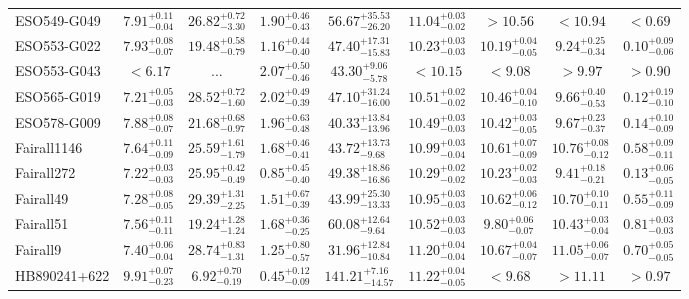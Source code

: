 \documentclass[onecolumn]{mn2e}
\begin{document}
{\begin{center}
\begin{longtable}{lcccccccc}
ESO549-G049 & $7.91_{-0.04}^{+0.11}$ & $26.82_{-3.30}^{+0.72}$ & $1.90_{-0.43}^{+0.46}$ &$56.67_{-26.20}^{+35.53}$ & $11.04_{-0.02}^{+0.03}$ & $>10.56$ & $<10.94$ & $<0.69$ \\
ESO553-G022 & $7.93_{-0.07}^{+0.08}$ & $19.48_{-0.79}^{+0.58}$ & $1.16_{-0.40}^{+0.44}$ &$47.40_{-15.83}^{+17.31}$ & $10.23_{-0.03}^{+0.03}$ & $10.19_{-0.05}^{+0.04}$ & $9.24_{-0.34}^{+0.25}$ & $0.10_{-0.06}^{+0.09}$ \\
ESO553-G043 & $<6.17$ & ... & $2.07_{-0.46}^{+0.50}$ &$43.30_{-5.78}^{+9.06}$ & $<10.15$ & $<9.08$ & $>9.97$ & $>0.90$ \\
ESO565-G019 & $7.21_{-0.03}^{+0.05}$ & $28.52_{-1.60}^{+0.72}$ & $2.02_{-0.39}^{+0.49}$ &$47.10_{-16.00}^{+31.24}$ & $10.51_{-0.02}^{+0.02}$ & $10.46_{-0.10}^{+0.04}$ & $9.66_{-0.53}^{+0.40}$ & $0.12_{-0.10}^{+0.19}$ \\
ESO578-G009 & $7.88_{-0.07}^{+0.08}$ & $21.68_{-0.97}^{+0.68}$ & $1.96_{-0.48}^{+0.63}$ &$40.33_{-13.96}^{+13.84}$ & $10.49_{-0.03}^{+0.03}$ & $10.42_{-0.05}^{+0.03}$ & $9.67_{-0.37}^{+0.23}$ & $0.14_{-0.09}^{+0.10}$ \\
Fairall1146 & $7.64_{-0.09}^{+0.11}$ & $25.59_{-1.79}^{+1.61}$ & $1.68_{-0.41}^{+0.46}$ &$43.72_{-9.68}^{+13.73}$ & $10.99_{-0.04}^{+0.03}$ & $10.61_{-0.09}^{+0.07}$ & $10.76_{-0.12}^{+0.08}$ & $0.58_{-0.11}^{+0.09}$ \\
Fairall272 & $7.22_{-0.03}^{+0.03}$ & $25.95_{-0.49}^{+0.42}$ & $0.85_{-0.40}^{+0.45}$ &$49.38_{-16.86}^{+18.86}$ & $10.29_{-0.02}^{+0.02}$ & $10.23_{-0.03}^{+0.02}$ & $9.41_{-0.21}^{+0.18}$ & $0.13_{-0.05}^{+0.06}$ \\
Fairall49 & $7.28_{-0.05}^{+0.08}$ & $29.39_{-2.25}^{+1.31}$ & $1.51_{-0.39}^{+0.67}$ &$43.99_{-13.33}^{+25.30}$ & $10.95_{-0.03}^{+0.03}$ & $10.62_{-0.12}^{+0.06}$ & $10.70_{-0.11}^{+0.10}$ & $0.55_{-0.09}^{+0.11}$ \\
Fairall51 & $7.56_{-0.11}^{+0.11}$ & $19.24_{-1.24}^{+1.28}$ & $1.68_{-0.25}^{+0.36}$ &$60.08_{-9.64}^{+12.64}$ & $10.52_{-0.03}^{+0.03}$ & $9.80_{-0.07}^{+0.06}$ & $10.43_{-0.04}^{+0.03}$ & $0.81_{-0.03}^{+0.03}$ \\
Fairall9 & $7.40_{-0.04}^{+0.06}$ & $28.74_{-1.31}^{+0.83}$ & $1.25_{-0.57}^{+0.80}$ &$31.96_{-10.84}^{+12.84}$ & $11.20_{-0.04}^{+0.04}$ & $10.67_{-0.07}^{+0.04}$ & $11.05_{-0.07}^{+0.06}$ & $0.70_{-0.05}^{+0.05}$ \\
HB890241+622 & $9.91_{-0.23}^{+0.07}$ & $6.92_{-0.19}^{+0.70}$ & $0.45_{-0.09}^{+0.12}$ &$141.21_{-14.57}^{+7.16}$ & $11.22_{-0.05}^{+0.04}$ & $<9.68$ & $>11.11$ & $>0.97$ \\

\end{longtable}
\end{center}}
\end{document}
